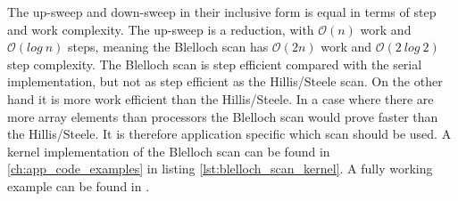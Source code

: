 The up-sweep and down-sweep in their inclusive form is equal in terms of step and work complexity. The up-sweep is a reduction, with $\mathcal{O}(n)$ work and $\mathcal{O}(log~n)$ steps, meaning the Blelloch scan has $\mathcal{O}(2n)$ work and $\mathcal{O}(2~log~2)$ step complexity. The Blelloch scan is step efficient compared with the serial implementation, but not as step efficient as the Hillis/Steele scan. On the other hand it is more work efficient than the Hillis/Steele. In a case where there are more array elements than processors the Blelloch scan would prove faster than the Hillis/Steele. It is therefore application specific which scan should be used.  A kernel implementation of the Blelloch scan can be found in \cref{ch:app_code_examples} in listing \ref{lst:blelloch_scan_kernel}. A fully working example can be found in \cite{exercises}.